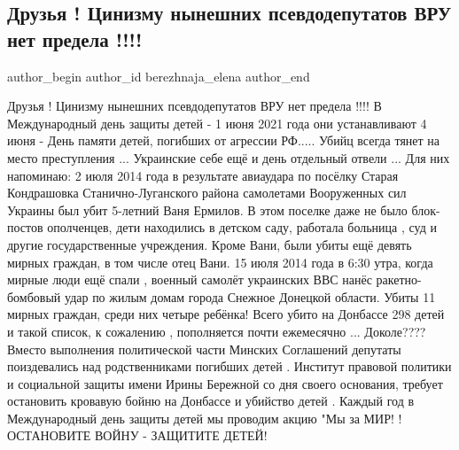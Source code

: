  
 
 
 
 
 
\subsection{Друзья ! Цинизму нынешних псевдодепутатов  ВРУ нет  предела !!!!}
\label{sec:04_06_2021.fb.berezhnaja_elena.1.cinizm_deputaty_vru_deti_aviaudar_lugansk_2014}
\ifcmt
 author_begin
   author_id berezhnaja_elena
 author_end
\fi

Друзья ! Цинизму нынешних псевдодепутатов  ВРУ нет предела !!!! В
Международный день защиты детей - 1 июня 2021 года они устанавливают 4 июня -
День памяти детей, погибших от агрессии РФ..... Убийц всегда тянет на место
преступления ... Украинские себе ещё и день отдельный отвели ... Для них
напоминаю: 2 июля 2014 года  в результате авиаудара по  посёлку  Старая
Кондрашовка Станично-Луганского района самолетами Вооруженных сил Украины был
убит 5-летний Ваня Ермилов. В этом поселке даже не было блок- постов
ополченцев, дети находились в детском саду, работала больница , суд и другие
государственные учреждения. Кроме Вани, были убиты ещё девять мирных граждан, в
том числе отец Вани. 15 июля 2014 года в 6:30 утра, когда мирные люди ещё спали
, военный самолёт украинских ВВС нанёс ракетно-бомбовый удар по жилым домам
города Снежное Донецкой области. Убиты 11 мирных граждан, среди них четыре
ребёнка! Всего убито на Донбассе 298 детей и такой список, к сожалению ,
пополняется почти ежемесячно ... Доколе???? Вместо выполнения политической
части Минских Соглашений депутаты поиздевались над родственниками погибших
детей . Институт правовой политики и социальной защиты имени Ирины Бережной со
дня своего основания,  требует остановить кровавую бойню на Донбассе и убийство
детей . Каждый год в Международный день защиты детей мы проводим акцию "Мы за
МИР! ! ОСТАНОВИТЕ ВОЙНУ - ЗАЩИТИТЕ ДЕТЕЙ!

